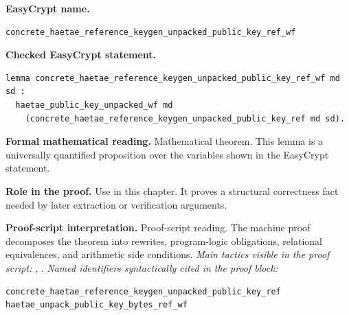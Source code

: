 \begin{formaltheorem}
\noindent\textbf{EasyCrypt name.}
\begin{lstlisting}[language=EasyCrypt,basicstyle=\ttfamily\scriptsize]
concrete_haetae_reference_keygen_unpacked_public_key_ref_wf
\end{lstlisting}
\noindent\textbf{Checked EasyCrypt statement.}
\begin{lstlisting}[language=EasyCrypt,basicstyle=\ttfamily\scriptsize]
lemma concrete_haetae_reference_keygen_unpacked_public_key_ref_wf md sd :
  haetae_public_key_unpacked_wf md
    (concrete_haetae_reference_keygen_unpacked_public_key_ref md sd).
\end{lstlisting}
\noindent\textbf{Formal mathematical reading.}
Mathematical theorem. This lemma is a universally quantified proposition over the variables shown in the EasyCrypt statement.

\noindent\textbf{Role in the proof.}
Use in this chapter. It proves a structural correctness fact needed by later extraction or verification arguments.

\noindent\textbf{Proof-script interpretation.}
Proof-script reading. The machine proof decomposes the theorem into rewrites, program-logic obligations, relational equivalences, and arithmetic side conditions.
\emph{Main tactics visible in the proof script:} , .
\emph{Named identifiers syntactically cited in the proof block:}
\begin{lstlisting}[language=EasyCrypt,basicstyle=\ttfamily\scriptsize]
concrete_haetae_reference_keygen_unpacked_public_key_ref
haetae_unpack_public_key_bytes_ref_wf
\end{lstlisting}

\end{formaltheorem}

